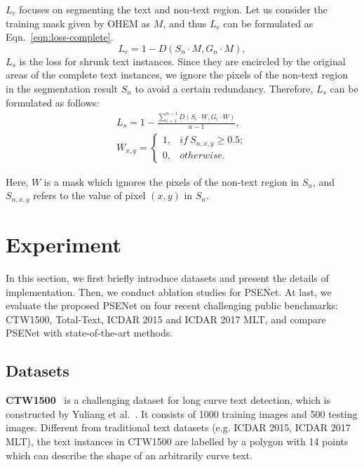 \documentclass[10pt,twocolumn,letterpaper]{article}
\begin{document}
	$L_c$ focuses on segmenting the text and non-text region. Let us consider the training mask given by OHEM as $M$, and thus $L_c$ can be formulated as Eqn.~\eqref{eqn:loss-complete}.
	\begin{equation}
	L_c = 1 - D(S_n \cdot M, G_n \cdot M),
	\label{eqn:loss-complete}
	\end{equation}
	$L_s$ is the loss for shrunk text instances. Since they are encircled by the original areas of the complete text instances, we ignore the pixels of the non-text region in the segmentation result $S_n$ to avoid a certain redundancy. Therefore, $L_s$ can be formulated as follows:
	\begin{equation}
	\begin{split}
	L_s = 1 - \frac{\sum\nolimits_{i = 1}^{n - 1} D(S_i \cdot W, G_i \cdot W)}{n - 1},\\
	W_{x, y} = 
	\left\{
	\begin{array}{ll}
	1, & if \ S_{n, x, y} \ge 0.5; \\  
	0, & otherwise.   
	\end{array}
	\right.  
	\label{eqn:loss-shrink}
	\end{split}
	\end{equation}
	
	Here, $W$ is a mask which ignores the pixels of the non-text region in $S_n$, and $S_{n, x, y}$ refers to the value of pixel $(x, y)$ in $S_n$.
	
	\section{Experiment}
	In this section, we first briefly introduce datasets and present the details of implementation.
	Then, we conduct ablation studies for PSENet. At last, we evaluate the proposed PSENet on four recent challenging public benchmarks: CTW1500, Total-Text, ICDAR 2015 and ICDAR 2017 MLT, and compare PSENet with state-of-the-art methods.
	
	\subsection{Datasets}
	
	\textbf{CTW1500}~\cite{Liu2017Detecting} is a challenging dataset for long curve text detection, which is constructed by Yuliang et al.~\cite{Liu2017Detecting}. It consists of 1000 training images and 500 testing images. Different from traditional text datasets (e.g. ICDAR 2015, ICDAR 2017 MLT), the text instances in CTW1500 are labelled by a polygon with 14 points which can describe the shape of an arbitrarily curve text.
	
\end{document}
